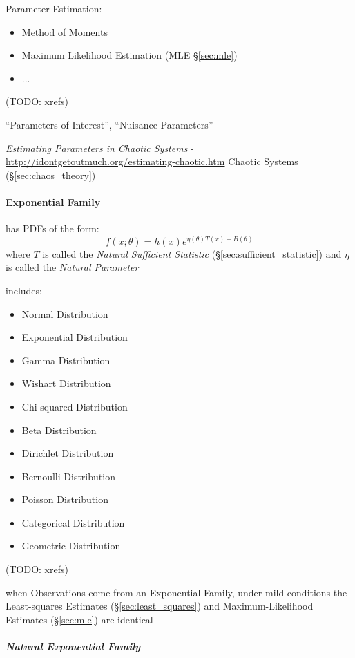 Parameter Estimation:
\begin{itemize}
  \item Method of Moments
  \item Maximum Likelihood Estimation (MLE \S\ref{sec:mle})
  \item ...
\end{itemize}
(TODO: xrefs)

``Parameters of Interest'', ``Nuisance Parameters''

\emph{Estimating Parameters in Chaotic Systems} -
\url{http://idontgetoutmuch.org/estimating-chaotic.htm} \fist Chaotic Systems
(\S\ref{sec:chaos_theory})



\paragraph{Exponential Family}\label{sec:exponential_family}\hfill

has PDFs of the form:
\[
  f(x; \theta) = h(x) e^{\eta(\theta)T(x) - B(\theta)}
\]
where $T$ is called the \emph{Natural Sufficient Statistic}
(\S\ref{sec:sufficient_statistic}) and $\eta$ is called the \emph{Natural
  Parameter}

includes:
\begin{itemize}
  \item Normal Distribution
  \item Exponential Distribution
  \item Gamma Distribution
  \item Wishart Distribution
  \item Chi-squared Distribution
  \item Beta Distribution
  \item Dirichlet Distribution
  \item Bernoulli Distribution
  \item Poisson Distribution
  \item Categorical Distribution
  \item Geometric Distribution
\end{itemize}
(TODO: xrefs)

when Observations come from an Exponential Family, under mild conditions the
Least-squares Estimates (\S\ref{sec:least_squares}) and Maximum-Likelihood
Estimates (\S\ref{sec:mle}) are identical



\subparagraph{Natural Exponential Family}
\label{sec:natural_exponential_family}\hfill

